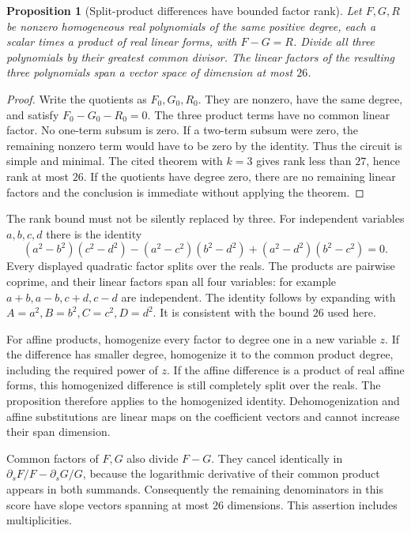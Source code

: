 \documentclass[11pt]{article}
\newtheorem{proposition}[theorem]{Proposition}
\begin{document}
\begin{proposition}[Split-product differences have bounded factor rank]
Let $F,G,R$ be nonzero homogeneous real polynomials of the same positive
degree, each a scalar times a product of real linear forms, with
$F-G=R$. Divide all three polynomials by their greatest common divisor.
The linear factors of the resulting three polynomials span a vector
space of dimension at most $26$.
\end{proposition}
\begin{proof}
Write the quotients as $F_0,G_0,R_0$. They are nonzero, have the same
degree, and satisfy $F_0-G_0-R_0=0$. The three product terms have no
common linear factor. No one-term subsum is zero. If a two-term subsum
were zero, the remaining nonzero term would have to be zero by the
identity. Thus the circuit is simple and minimal. The cited theorem
with $k=3$ gives rank less than $27$, hence rank at most $26$.
If the quotients have degree zero, there are no remaining linear factors
and the conclusion is immediate without applying the theorem.
\end{proof}

The rank bound must not be silently replaced by three. For independent
variables $a,b,c,d$ there is the identity
\[
 (a^2-b^2)(c^2-d^2)-(a^2-c^2)(b^2-d^2)
 +(a^2-d^2)(b^2-c^2)=0.
\]
Every displayed quadratic factor splits over the reals. The products
are pairwise coprime, and their linear factors span all four variables:
for example $a+b,a-b,c+d,c-d$ are independent. The identity follows
by expanding with $A=a^2,B=b^2,C=c^2,D=d^2$. It is consistent with
the bound $26$ used here.

For affine products, homogenize every factor to degree one in a new
variable $z$. If the difference has smaller degree, homogenize it to
the common product degree, including the required power of $z$.
If the affine difference is a product of real affine forms, this
homogenized difference is still completely split over the reals.
The proposition therefore applies to the homogenized identity.
Dehomogenization and affine substitutions are linear maps on the
coefficient vectors and cannot increase their span dimension.

Common factors of $F,G$ also divide $F-G$. They cancel identically in
$\partial_s F/F-\partial_s G/G$, because the logarithmic derivative
of their common product appears in both summands. Consequently the
remaining denominators in this score have slope vectors spanning at
most $26$ dimensions. This assertion includes multiplicities.
\end{document}
